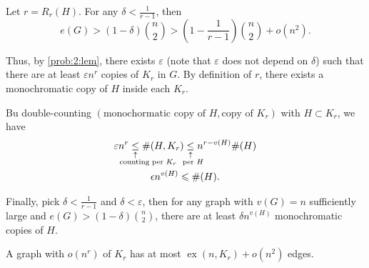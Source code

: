 \documentclass[10pt, a4paper]{article}
\DeclareMathOperator\ex{ex}
\newcommand{\signexpl}[3]{%
  \underset{\substack{\uparrow\\\mathrlap{\text{\hspace{#3}#2}}}}{#1}}
\begin{document}
\begin{sol}
	Let $r = R_r(H)$. For any $\delta < \frac{1}{r-1}$, then \[
		e(G) > (1 - \delta)\binom{n}{2} > \left(1 - \frac{1}{r-1}\right)\binom{n}{2} + o(n^2).
	\]

	Thus, by \cref{prob:2:lem}, there exists $\varepsilon$ (note that $\varepsilon$ does not depend on $\delta$) such that there are at least $\varepsilon n^r$ copies of $K_r$ in $G$. By definition of $r$, there exists a monochromatic copy of $H$ inside each $K_r$.

	Bu double-counting $(\text{monochormatic copy of }H, \text{copy of }K_r)$ with  $H \subset K_r$, we have
	\begin{gather*}
		\varepsilon n^r \signexpl{\le}{counting per $K_r$}{-2em}  \#(H, K_r)
		\signexpl{\le}{per $H$}{-1em} n^{r - v(H)} \#(H)\\
		\epsilon n^{v(H)} \leqslant \#(H).
	\end{gather*}

	Finally, pick $\delta < \frac{1}{r-1}$ and $\delta < \varepsilon$, then for any graph with $v(G) = n$ sufficiently large and $e(G) > (1-\delta)\binom{n}{2}$, there are at least $\delta n^{v(H)}$ monochromatic copies of $H$.
\end{sol}

\begin{lem}\label{prob:2:lem}
	A graph with $o(n^r)$ of $K_r$ has at most $\ex(n, K_r) + o(n^2)$ edges.
\end{lem}
\end{document}

